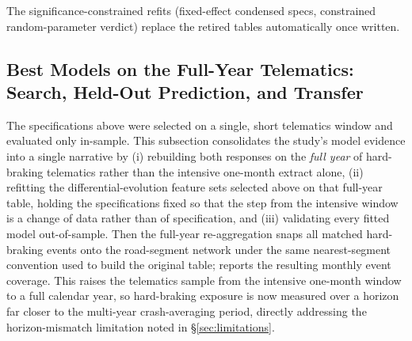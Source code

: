 \documentclass[letterpaper,8pt]{extarticle}  %
\begin{document}
\begin{doublespacing}
\begin{linenumbers}
The significance-constrained refits (fixed-effect condensed specs, constrained random-parameter verdict) replace the retired tables automatically once written.


\FloatBarrier

\subsection{Best Models on the Full-Year Telematics: Search, Held-Out Prediction, and Transfer}\label{sec:best-models}

The specifications above were selected on a single, short telematics window and evaluated only in-sample. This subsection consolidates the study's model evidence into a single narrative by (i) rebuilding both responses on the \emph{full year} of hard-braking telematics rather than the intensive one-month extract alone, (ii) refitting the differential-evolution feature sets selected above on that full-year table, holding the specifications fixed so that the step from the intensive window is a change of data rather than of specification, and (iii) validating every fitted model out-of-sample. Then the full-year re-aggregation snaps all matched hard-braking events onto the road-segment network under the same nearest-segment convention used to build the original table;  reports the resulting monthly event coverage. This raises the telematics sample from the intensive one-month window to a full calendar year, so hard-braking exposure is now measured over a horizon far closer to the multi-year crash-averaging period, directly addressing the horizon-mismatch limitation noted in \S\ref{sec:limitations}.


\end{linenumbers}
\end{doublespacing}
\end{document}
